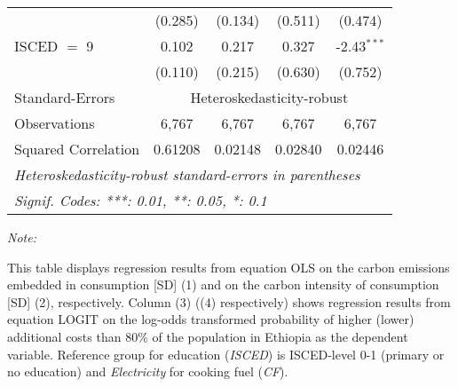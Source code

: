 \begin{table}[htbp!]
\begin{adjustbox}{width = 1\textwidth, max height = 0.95\textheight, center}
\begin{threeparttable}[b]
\begin{tabular}{lcccc}
                                 & (0.285)            & (0.134)            & (0.511)        & (0.474)\\   
            ISCED $=$ 9          & 0.102              & 0.217              & 0.327          & -2.43$^{***}$\\   
                                 & (0.110)            & (0.215)            & (0.630)        & (0.752)\\   
            \midrule 
            Standard-Errors & \multicolumn{4}{c}{Heteroskedasticity-robust} \\ 
            Observations         & 6,767              & 6,767              & 6,767          & 6,767\\  
            Squared Correlation  & 0.61208            & 0.02148            & 0.02840        & 0.02446\\  
            \midrule \midrule
            \multicolumn{5}{l}{\emph{Heteroskedasticity-robust standard-errors in parentheses}}\\
            \multicolumn{5}{l}{\emph{Signif. Codes: ***: 0.01, **: 0.05, *: 0.1}}\\
         \end{tabular}
         
         \begin{tablenotes}\item \medskip \textit{Note:}
            \item This table displays regression results from equation OLS on the carbon emissions embedded in consumption [SD] (1) and on the carbon intensity of consumption [SD] (2), respectively. 
                                      Column (3) ((4) respectively) shows regression results from equation LOGIT on the log-odds transformed probability of higher (lower) additional costs than 80\% of the population in Ethiopia as the dependent variable. Reference group for education (\textit{ISCED}) is ISCED-level 0-1 (primary or no education) and \textit{Electricity} for cooking fuel (\textit{CF}).
         \end{tablenotes}
      \end{threeparttable}
   \end{adjustbox}
\end{table}



